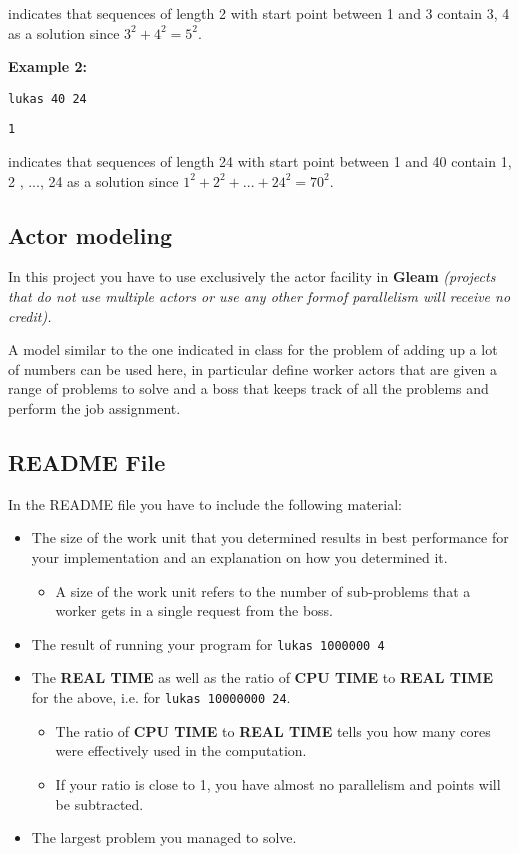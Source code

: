 \documentclass{article}
\begin{document}
\noindent indicates that sequences of length 2 with start point between 1 and 3 contain 3, 4 as a solution since \(3^2 + 4^2 = 5^2\).

\newpage

\noindent\textbf{Example 2:}

\texttt{lukas 40 24}

\texttt{1}

\hspace{1cm}

\noindent indicates that sequences of length 24 with start point between 1 and 40 contain 1, 2 , ..., 24 as a solution since \(1^2 + 2^2 + ... + 24^2 = 70^2\).

\subsection{Actor modeling} In this project you have to use exclusively the actor facility in \textbf{Gleam} \textit{(projects that do not use multiple actors or use any other formof parallelism will receive no credit).} 

A model similar to the one indicated in class for the problem of adding up a lot of numbers can be used here, in particular define worker actors that are given a range of problems to solve and a boss that keeps track of all the problems and perform the job assignment.

\subsection{README File} In the README file you have to include the following material:

\begin{itemize}
    \item The size of the work unit that you determined results in best performance for your implementation and an explanation on how you determined it. 
    \begin{itemize}
        \item A size of the work unit refers to the number of sub-problems that a worker gets in a single request from the boss.
    \end{itemize}

    \item The result of running your program for \texttt{lukas 1000000 4}
    
    \item The \textbf{REAL TIME} as well as the ratio of \textbf{CPU TIME} to \textbf{REAL TIME} for the above, i.e. for \texttt{lukas 10000000 24}.
    \begin{itemize}
        \item The ratio of \textbf{CPU TIME} to \textbf{REAL TIME} tells you how many cores were effectively used in the computation. 
        \item If your ratio is close to 1, you have almost no parallelism and points will be subtracted.
    \end{itemize}
    
    \item The largest problem you managed to solve.
\end{itemize}
\end{document}
